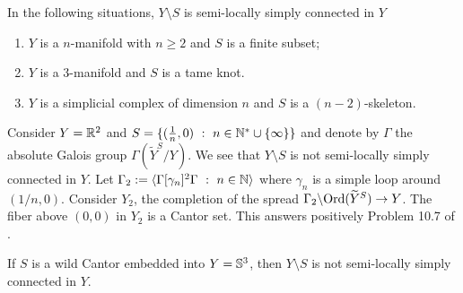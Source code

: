 \begin{ex}\label{ex:following_situations_semi_locally_simply}  In the following situations,  $Y\setminus S$ is semi-locally simply connected in $Y$ 
\begin{enumerate}
 \item $Y$ is a $n$-manifold with $n\geq 2$ and $S$ is a finite subset;
 \item $Y$ is a 3-manifold and $S$ is a tame knot.
 \item $Y$ is a simplicial complex of dimension $n$ and $S$ is a $(n-2)$-skeleton.
\end{enumerate}

 
\end{ex}

\begin{ex}\label{ex:consider_denote_absolute_galois} Consider $Y = \mathbb R^2$ and $S=\{(\frac{1}{n},0)~:~n\in \mathbb{N}^*\cup\{\infty\}\}$ and denote by $\Gamma$ the absolute Galois group $\Gamma(\widetilde Y^S/Y)$. We see that $Y\setminus S$ is not semi-locally simply connected in $Y$.  
Let $\Gamma_2:=\langle \Gamma[\gamma_n]^2\Gamma~:~ n\in \mathbb{N} \rangle$ where $\gamma_n$ is a simple loop around $(1/n,0)$. Consider $Y_2$, the completion of the spread $\Gamma_2\backslash\mathrm{Ord}(\widetilde Y^S) \rightarrow Y$.
The fiber above $(0,0)$ in  $Y_2$ is  a Cantor set. This answers positively Problem 10.7 of \cite{MR2198590}. 


\end{ex}


\begin{ex}\label{ex:wild_cantor_general_antoine} If $S$ is a  wild Cantor \cite{general_antoine} embedded into $Y = \mathbb{S}^3$, then $Y\setminus S$ is not semi-locally simply connected in $Y$.
\end{ex}



